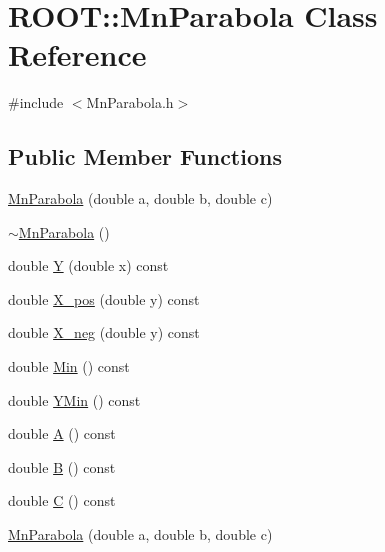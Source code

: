 \hypertarget{classROOT_1_1Minuit2_1_1MnParabola}{}\section{R\+O\+OT\+:\+:Mn\+Parabola Class Reference}
\label{classROOT_1_1Minuit2_1_1MnParabola}


{\ttfamily \#include $<$Mn\+Parabola.\+h$>$}

\subsection*{Public Member Functions}
\begin{DoxyCompactItemize}
\item 
\mbox{\hyperlink{classROOT_1_1Minuit2_1_1MnParabola_ae6e3ffd6c7a3d586d8c72ae35ead4448}{Mn\+Parabola}} (double a, double b, double c)
\item 
\mbox{\hyperlink{classROOT_1_1Minuit2_1_1MnParabola_ae5d6b58d6c4f02ad9b34bb397157f9e2}{$\sim$\+Mn\+Parabola}} ()
\item 
double \mbox{\hyperlink{classROOT_1_1Minuit2_1_1MnParabola_af429c12e92f120e38f75147fd3fc857c}{Y}} (double x) const
\item 
double \mbox{\hyperlink{classROOT_1_1Minuit2_1_1MnParabola_a2b4623df00488ca3d4175eb92123066e}{X\+\_\+pos}} (double y) const
\item 
double \mbox{\hyperlink{classROOT_1_1Minuit2_1_1MnParabola_a16f7f02dd1cb070e89fb007331066ee3}{X\+\_\+neg}} (double y) const
\item 
double \mbox{\hyperlink{classROOT_1_1Minuit2_1_1MnParabola_ab3c7e51f6276d9ebf6d28fe965914bc8}{Min}} () const
\item 
double \mbox{\hyperlink{classROOT_1_1Minuit2_1_1MnParabola_a7efab0e0a9902151738605a552adef41}{Y\+Min}} () const
\item 
double \mbox{\hyperlink{classROOT_1_1Minuit2_1_1MnParabola_ae5ca4bea19ba4c0243ca70bb6e55e827}{A}} () const
\item 
double \mbox{\hyperlink{classROOT_1_1Minuit2_1_1MnParabola_a878824850afd7ec98fd8685bec89784b}{B}} () const
\item 
double \mbox{\hyperlink{classROOT_1_1Minuit2_1_1MnParabola_a9ca632ea018da194e08eb18d4b0059f9}{C}} () const
\item 
\mbox{\hyperlink{classROOT_1_1Minuit2_1_1MnParabola_ae6e3ffd6c7a3d586d8c72ae35ead4448}{Mn\+Parabola}} (double a, double b, double c)

\end{DoxyCompactItemize}
